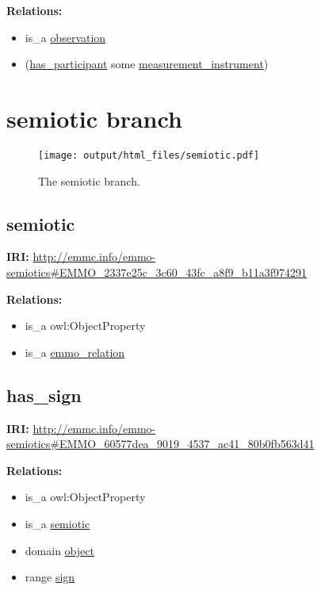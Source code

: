 \documentclass[a4paper,]{report}
\providecommand{\tightlist}{%
  \setlength{\itemsep}{0pt}\setlength{\parskip}{0pt}}
\begin{document}
\textbf{Relations:}

\begin{itemize}
\tightlist
\item
  is\_a \protect\hyperlink{observation}{observation}
\item
  (\protect\hyperlink{has_participant}{has\_participant} some
  \protect\hyperlink{measurement_instrument}{measurement\_instrument})
\end{itemize}

\hypertarget{semiotic-branch-1}{%
\section{semiotic branch}\label{semiotic-branch-1}}

\begin{figure}
\centering
\texttt{[image: output/html\_files/semiotic.pdf]}
\caption{The semiotic branch.}
\end{figure}

\hypertarget{semiotic-2}{%
\subsection{semiotic}\label{semiotic-2}}

\textbf{IRI:}
\url{http://emmc.info/emmo-semiotics\#EMMO_2337e25c_3c60_43fc_a8f9_b11a3f974291}

\textbf{Relations:}

\begin{itemize}
\tightlist
\item
  is\_a owl:ObjectProperty
\item
  is\_a \protect\hyperlink{emmo_relation}{emmo\_relation}
\end{itemize}

\hypertarget{has_sign-1}{%
\subsection{has\_sign}\label{has_sign-1}}

\textbf{IRI:}
\url{http://emmc.info/emmo-semiotics\#EMMO_60577dea_9019_4537_ac41_80b0fb563d41}

\textbf{Relations:}

\begin{itemize}
\tightlist
\item
  is\_a owl:ObjectProperty
\item
  is\_a \protect\hyperlink{semiotic}{semiotic}
\item
  domain \protect\hyperlink{object}{object}
\item
  range \protect\hyperlink{sign}{sign}
\end{itemize}
\end{document}
